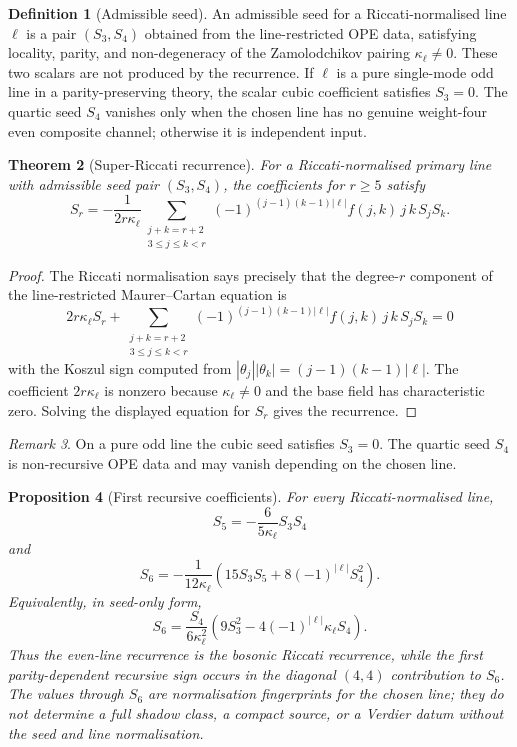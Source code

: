 \documentclass[11pt]{amsart}
\newtheorem{theorem}{Theorem}
\newtheorem{proposition}[theorem]{Proposition}
\theoremstyle{definition}
\newtheorem{definition}[theorem]{Definition}
\theoremstyle{remark}
\newtheorem{remark}[theorem]{Remark}
\begin{document}
\begin{definition}[Admissible seed]
An admissible seed for a Riccati-normalised line \(\ell\) is a pair
\((S_3,S_4)\) obtained from the line-restricted OPE data, satisfying
locality, parity, and non-degeneracy of the Zamolodchikov pairing
\(\kappa_\ell\neq0\). These two scalars are not produced by the
recurrence. If \(\ell\) is a pure single-mode odd line in a
parity-preserving theory, the scalar cubic coefficient satisfies
\(S_3=0\). The quartic seed \(S_4\) vanishes only when the chosen line has
no genuine weight-four even composite channel; otherwise it is independent
input.
\end{definition}

\begin{theorem}[Super-Riccati recurrence]
For a Riccati-normalised primary line with admissible seed pair
\((S_3,S_4)\), the coefficients for \(r\geq 5\) satisfy
\[
S_r
=-\frac{1}{2r\kappa_\ell}
  \sum_{\substack{j+k=r+2\\ 3\leq j\leq k<r}}
  (-1)^{(j-1)(k-1)|\ell|}
  f(j,k)\,j\,k\,S_jS_k .
\]
\end{theorem}

\begin{proof}
The Riccati normalisation says precisely that the degree-\(r\) component
of the line-restricted Maurer--Cartan equation is
\[
        2r\kappa_\ell S_r
        +\sum_{\substack{j+k=r+2\\3\leq j\leq k<r}}
          (-1)^{(j-1)(k-1)|\ell|} f(j,k)\,j\,k\,S_jS_k=0
\]
with the Koszul sign computed from
\(|\theta_j||\theta_k|=(j-1)(k-1)|\ell|\). The coefficient
\(2r\kappa_\ell\) is nonzero because \(\kappa_\ell\neq0\) and the base
field has characteristic zero. Solving the displayed equation for \(S_r\)
gives the recurrence.
\end{proof}

\begin{remark}
On a pure odd line the cubic seed satisfies \(S_3=0\). The quartic seed
\(S_4\) is non-recursive OPE data and may vanish depending on the chosen
line.
\end{remark}

\begin{proposition}[First recursive coefficients]
For every Riccati-normalised line,
\[
        S_5=-\frac{6}{5\kappa_\ell}S_3S_4
\]
and
\[
        S_6
        =
        -\frac{1}{12\kappa_\ell}
        \left(15S_3S_5+8(-1)^{|\ell|}S_4^2\right).
\]
Equivalently, in seed-only form,
\[
        S_6
        =
        \frac{S_4}{6\kappa_\ell^2}
        \left(9S_3^2-4(-1)^{|\ell|}\kappa_\ell S_4\right).
\]
Thus the even-line recurrence is the bosonic Riccati recurrence, while
the first parity-dependent recursive sign occurs in the diagonal
\((4,4)\) contribution to \(S_6\). The values through \(S_6\) are
normalisation fingerprints for the chosen line; they do not determine a
full shadow class, a compact source, or a Verdier datum without the seed
and line normalisation.
\end{proposition}
\end{document}
